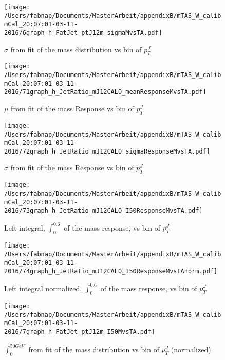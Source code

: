 \begin{figure}

\texttt{[image: /Users/fabnap/Documents/MasterArbeit/appendixB/mTAS\_W\_calibmCal\_20:07:01-03-11-2016/6graph\_h\_FatJet\_ptJ12m\_sigmaMvsTA.pdf]}
\caption{$\sigma$ from fit of the mass distribution vs bin of $p_{T}^{J}$ }

\end{figure}

\clearpage

\begin{figure}

\texttt{[image: /Users/fabnap/Documents/MasterArbeit/appendixB/mTAS\_W\_calibmCal\_20:07:01-03-11-2016/71graph\_h\_JetRatio\_mJ12CALO\_meanResponseMvsTA.pdf]}
\caption{$\mu $ from fit of the mass Response vs bin of  $p_{T}^{J}$}

\end{figure}
\begin{figure}

\texttt{[image: /Users/fabnap/Documents/MasterArbeit/appendixB/mTAS\_W\_calibmCal\_20:07:01-03-11-2016/72graph\_h\_JetRatio\_mJ12CALO\_sigmaResponseMvsTA.pdf]}
\caption{$\sigma $ from fit of the mass Response vs bin of $p_{T}^{J}$}

\end{figure}

\begin{figure}

\texttt{[image: /Users/fabnap/Documents/MasterArbeit/appendixB/mTAS\_W\_calibmCal\_20:07:01-03-11-2016/73graph\_h\_JetRatio\_mJ12CALO\_I50ResponseMvsTA.pdf]}
\caption{Left integral, $\int_{0}^{0.6} $ of the mass response, vs bin of  $p_{T}^{J}$}

\end{figure}

\begin{figure}

\texttt{[image: /Users/fabnap/Documents/MasterArbeit/appendixB/mTAS\_W\_calibmCal\_20:07:01-03-11-2016/74graph\_h\_JetRatio\_mJ12CALO\_I50ResponseMvsTAnorm.pdf]}
\caption{Left integral normalized, $\int_{0}^{0.6} $ of the mass response, vs bin of  $p_{T}^{J}$}

\end{figure}

\begin{figure}

\texttt{[image: /Users/fabnap/Documents/MasterArbeit/appendixB/mTAS\_W\_calibmCal\_20:07:01-03-11-2016/7graph\_h\_FatJet\_ptJ12m\_I50MvsTA.pdf]}
\caption{$\int_{0}^{50 GeV}$ from fit of the mass distribution vs bin of $p_{T}^{J}$ (normalized)}

\end{figure}

